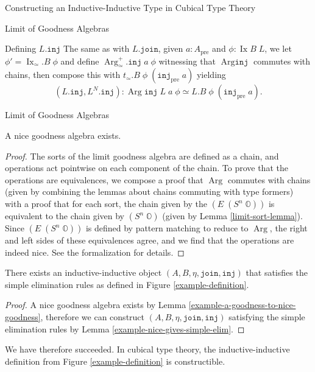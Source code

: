 \documentclass[runningheads]{llncs}
\DeclareMathOperator{\Arg}{Arg}
\DeclareMathOperator{\Ix}{Ix}
\newcommand{\pre}[1]{{#1}_\text{pre}}
\newcommand{\bbO}{\mathbb{O}}
\newcommand{\join}{\texttt{join}}
\newcommand{\inj}{\texttt{inj}}
\begin{document}
\begin{section}{Constructing an Inductive-Inductive Type in Cubical Type Theory}
\begin{subsection}{Limit of Goodness Algebras}
{\begin{subsubsection}{Defining $L.\inj$}
The same as with $L.\join$, given $a : \pre{A}$ and $\phi : \Ix B\;L$, we let $\phi' = \Ix_\simeq.B\;\phi$ and define $\Arg_\simeq^+.\inj\;a\;\phi$ witnessing that $\Arg\inj$ commutes with chains, then compose this with $t_\simeq.B\;\phi\;(\pre{\inj}\;a)$ yielding \[(L.\inj, L^N.\inj) : \Arg\inj\;L\;a\;\phi \simeq L.B\;\phi\;(\pre{\inj}\;a).\]
\end{subsubsection}
}

\begin{subsubsection}{Limit of Goodness Algebras}
\begin{lemma}\label{example-a-goodness-to-nice-goodness}
    A nice goodness algebra exists.
\end{lemma}
\begin{proof}
    The sorts of the limit goodness algebra are defined as a chain, and operations act pointwise on each component of the chain. To prove that the operations are equivalences, we compose a proof that $\Arg$ commutes with chains (given by combining the lemmas about chains commuting with type formers) with a proof that for each sort, the chain given by the $(E\;(S^n\;\bbO))$ is equivalent to the chain given by $(S^n\;\bbO)$ (given by Lemma \ref{limit-sort-lemma}). Since $(E\;(S^n\;\bbO))$ is defined by pattern matching to reduce to $\Arg$, the right and left sides of these equivalences agree, and we find that the operations are indeed nice. See the formalization for details.
\end{proof}

\begin{theorem}\label{example-constructed-II}
    There exists an inductive-inductive object $(A, B, \eta, \join, \inj)$ that satisfies the simple elimination rules as defined in Figure \ref{example-definition}.
\end{theorem}
\begin{proof}
    A nice goodness algebra exists by Lemma \ref{example-a-goodness-to-nice-goodness}, therefore we can construct $(A, B, \eta, \join, \inj)$ satisfying the simple elimination rules by Lemma \ref{example-nice-gives-simple-elim}.
\end{proof}

We have therefore succeeded. In cubical type theory, the inductive-inductive definition from Figure \ref{example-definition} is constructible.

\end{subsubsection}

\end{subsection}

\end{section}
\end{document}
